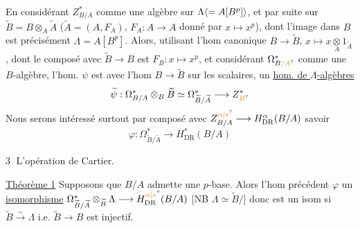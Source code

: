 En considérant $Z^*_{B/A}$ comme une algèbre sur $\Lambda\inserted{=A[B^p]}$, et par suite sur $\widetilde B=B\otimes_A\widetilde A$ ($\widetilde A=(A,F_A)$, $F_A:A\longrightarrow A$ donné par $x\mapsto x^p$),
dont l'image dans $B$ est précisément $\Lambda=A[B^p]$. Alors, utilisant l'hom canonique $B\longrightarrow\widetilde B$, $x\longmapsto x\underset A\otimes1_{\widetilde A}$, dont le composé avec $\widetilde B\longrightarrow B$ est $F_B:x\longmapsto x^p$, et considérant $\Omega^*_{B\unsure{/A}}$ comme une $B$-algèbre, l'hom. $\psi$ est  avec l'hom $B\longrightarrow\widetilde B$ sur les scalaires,  un \uline{hom. de $\Lambda$-algèbres}
\[
 \widetilde\psi:\Omega^*_{B/A}\otimes_B\widetilde B\simeq
 \Omega^*_{\widetilde B/\widetilde A}\longrightarrow Z^*_{\unsure{B}}
\]
 Nous serons intéressé surtout par  composé avec $Z^{\unsure{\alpha|*}}_{B/A}\longrightarrow H^\alpha_{\mathrm{DR}}(B/A)$ savoir
\[
 \boxed{\varphi:\Omega^*_{\widetilde B/\widetilde A}\longrightarrow H^*_{\mathrm{DR}}(B/A)}
\]

\textcircled{3} L'opération de Cartier.

\uline{Théorème 1} Supposons que $B/A$ admette une $p$-base. Alors l'hom précédent $\varphi$  un \uline{isomorphisme} $\Omega^*_{\widetilde B/\widetilde A}\otimes_{\widetilde B}\Lambda\longrightarrow H^{\unsure{\alpha|*}}_{\mathrm{DR}}(B/A)$ [NB $\Lambda\simeq\widetilde B/$] donc est un isom si $\widetilde B\xrightarrow{\sim}\Lambda$ i.e. $\widetilde B\longrightarrow B$ est injectif.

